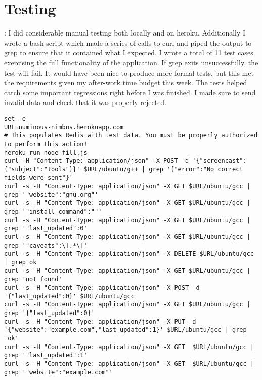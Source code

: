 \documentclass[12pt]{article}
\begin{document}
\section{Testing}:
I did considerable manual testing both locally and on heroku. Additionally I wrote a bash script which made a series of calls to curl and piped the output to grep to ensure that it contained what I expected. I wrote a total of 11 test cases exercising the full functionality of the application. If grep exits unsuccessfully, the test will fail. It would have been nice to produce more formal tests, but this met the requirements given my after-work time budget this week. The tests helped catch some important regressions right before I was finished. I made sure to send invalid data and check that it was properly rejected.

\begin{lstlisting}
set -e
URL=numinous-nimbus.herokuapp.com
# This populates Redis with test data. You must be properly authorized to perform this action!
heroku run node fill.js
curl -H "Content-Type: application/json" -X POST -d '{"screencast":{"subject":"tools"}}' $URL/ubuntu/g++ | grep '{"error":"No correct fields were sent"}'
curl -s -H "Content-Type: application/json" -X GET $URL/ubuntu/gcc | grep '"website":"gnu.org"'
curl -s -H "Content-Type: application/json" -X GET $URL/ubuntu/gcc | grep '"install_command":""'
curl -s -H "Content-Type: application/json" -X GET $URL/ubuntu/gcc | grep '"last_updated":0'
curl -s -H "Content-Type: application/json" -X GET $URL/ubuntu/gcc | grep '"caveats":\[.*\]'
curl -s -H "Content-Type: application/json" -X DELETE $URL/ubuntu/gcc | grep ok
curl -s -H "Content-Type: application/json" -X GET $URL/ubuntu/gcc | grep 'not found'
curl -s -H "Content-Type: application/json" -X POST -d '{"last_updated":0}' $URL/ubuntu/gcc
curl -s -H "Content-Type: application/json" -X GET $URL/ubuntu/gcc | grep '{"last_updated":0}'
curl -s -H "Content-Type: application/json" -X PUT -d '{"website":"example.com","last_updated":1}' $URL/ubuntu/gcc | grep 'ok'
curl -s -H "Content-Type: application/json" -X GET  $URL/ubuntu/gcc | grep '"last_updated":1'
curl -s -H "Content-Type: application/json" -X GET  $URL/ubuntu/gcc | grep '"website":"example.com"'
\end{lstlisting}
\end{document}
